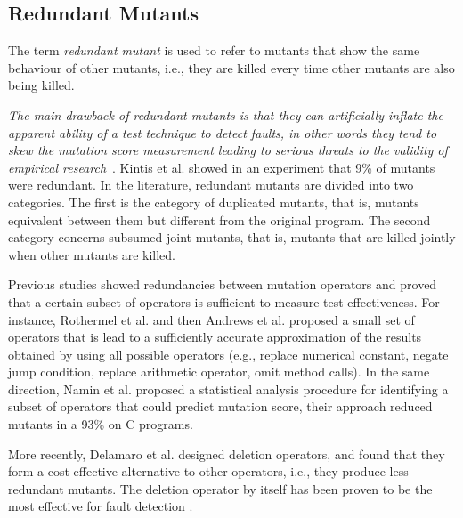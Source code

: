 
\subsection{Redundant Mutants}
\label{sec:opt:redundant}

The term \emph{redundant mutant} is used to refer to mutants that show the same behaviour of other mutants, i.e., they
are killed every time other mutants are also being killed. 

\emph{The main drawback of redundant mutants is that they can artificially inflate the apparent ability of a test technique to detect faults, in other words they tend to skew the mutation score measurement leading to serious threats to the validity of empirical research}~\cite{papadakis2016threats}.
Kintis et al. \cite{kintis2010evaluating} showed in an experiment that 9\% of mutants were redundant. In the literature, redundant mutants are divided into two categories. The first is the category of duplicated mutants, that is, mutants equivalent between them but different from the original program. The second category concerns subsumed-joint mutants, that is, mutants that are killed jointly when other mutants are killed.

Previous studies showed redundancies between mutation operators and proved that a certain subset of operators is sufficient to measure test effectiveness. For instance, Rothermel et al. \cite{rothermel1996experimental} and then Andrews et al. \cite{andrews2005mutation} proposed a small set of operators that is lead to a sufficiently accurate approximation of the results obtained by using all possible operators (e.g., replace numerical constant, negate jump condition, replace arithmetic operator, omit method calls). In the same direction, Namin et al. \cite{siami2008sufficient} proposed a statistical analysis procedure for identifying a subset of operators that could predict mutation score, their approach reduced mutants in a 93\% on C programs. 

More recently, Delamaro et al. \cite{delamaro2014designing} designed deletion operators, and found that they form a cost-effective alternative to other operators, i.e., they produce less redundant mutants. The deletion operator by itself has been proven to be the most effective for fault detection \cite{delamaro2014designing}.

